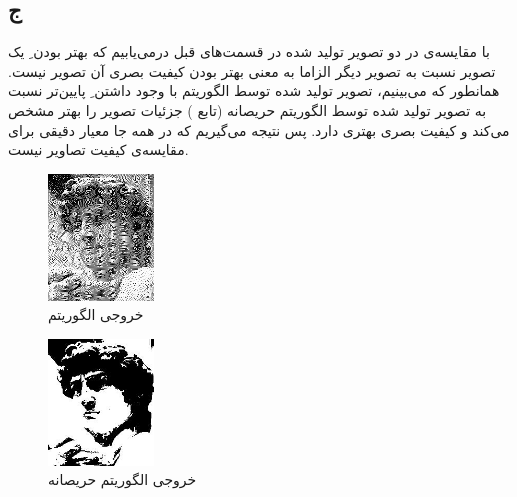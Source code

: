 \documentclass{article}
\begin{document}
\subsection{ج}
\begin{latin}

\end{latin}
با مقایسه‌ی  در دو تصویر تولید شده در قسمت‌های قبل درمی‌یابیم که بهتر بودن ِ یک تصویر نسبت به تصویر دیگر الزاما به معنی بهتر بودن کیفیت بصری آن تصویر نیست. همانطور که می‌بینیم، تصویر تولید شده توسط الگوریتم  با وجود داشتن ِ پایین‌تر نسبت به تصویر تولید شده توسط الگوریتم حریصانه (تابع ) جزئیات تصویر را بهتر مشخص می‌کند و کیفیت بصری بهتری دارد. پس نتیجه می‌گیریم که  در همه جا معیار دقیقی برای مقایسه‌ی کیفیت تصاویر نیست.
\begin{figure}[H]
    \centering
    \includegraphics[width=0.25\textwidth]{figures/3c1.jpg}
    \caption
	{
خروجی الگوریتم 
	}
    \label{fig:fig1}
\end{figure}
\begin{figure}[H]
    \centering
    \includegraphics[width=0.25\textwidth]{figures/3c2.jpg}
    \caption
	{
خروجی الگوریتم حریصانه
	}
    \label{fig:fig1}
\end{figure}


\section{}%
\subsection{}
\begin{latin}

\end{latin}
\end{document}
